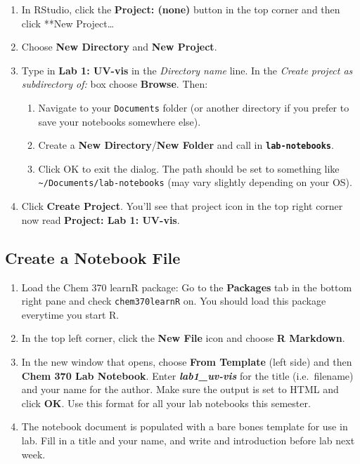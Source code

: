 \documentclass[]{tufte-book}
\providecommand{\tightlist}{%
  \setlength{\itemsep}{0pt}\setlength{\parskip}{0pt}}
\begin{document}
\begin{enumerate}
\def\labelenumi{\arabic{enumi}.}
\tightlist
\item
  In RStudio, click the \textbf{Project: (none)} button in the top corner and then click **New Project\ldots*
\item
  Choose \textbf{New Directory} and \textbf{New Project}.
\item
  Type in \textbf{Lab 1: UV-vis} in the \emph{Directory name} line. In the \emph{Create project as subdirectory of:} box choose \textbf{Browse}. Then:

  \begin{enumerate}
  \def\labelenumii{\arabic{enumii}.}
  \tightlist
  \item
    Navigate to your \texttt{Documents} folder (or another directory if you prefer to save your notebooks somewhere else).
  \item
    Create a \textbf{New Directory}/\textbf{New Folder} and call in \textbf{\texttt{lab-notebooks}}.
  \item
    Click OK to exit the dialog. The path should be set to something like \texttt{\textasciitilde{}/Documents/lab-notebooks} (may vary slightly depending on your OS).
  \end{enumerate}
\item
  Click \textbf{Create Project}. You'll see that project icon in the top right corner now read \textbf{Project: Lab 1: UV-vis}.
\end{enumerate}

\hypertarget{create-a-notebook-file}{%
\subsection*{Create a Notebook File}\label{create-a-notebook-file}}

\begin{enumerate}
\def\labelenumi{\arabic{enumi}.}
\tightlist
\item
  Load the Chem 370 learnR package: Go to the \textbf{Packages} tab in the bottom right pane and check \texttt{chem370learnR} on. You should load this package everytime you start R.
\item
  In the top left corner, click the \textbf{New File} icon and choose \textbf{R Markdown}.
\item
  In the new window that opens, choose \textbf{From Template} (left side) and then \textbf{Chem 370 Lab Notebook}. Enter \textbf{\emph{lab1\_uv-vis}} for the title (i.e.~filename) and your name for the author. Make sure the output is set to HTML and click \textbf{OK}. Use this format for all your lab notebooks this semester.
\item
  The notebook document is populated with a bare bones template for use in lab. Fill in a title and your name, and write and introduction before lab next week.
\end{enumerate}
\end{document}
